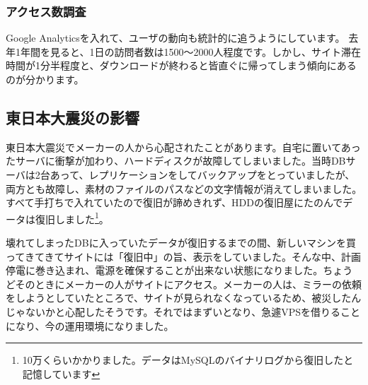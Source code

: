 
\subsubsection{アクセス数調査}
Google Analyticsを入れて、ユーザの動向も統計的に追うようにしています。
去年1年間を見ると、1日の訪問者数は1500～2000人程度です。しかし、サイト滞在時間が1分半程度と、ダウンロードが終わると皆直ぐに帰ってしまう傾向にあるのが分かります。

\subsection{東日本大震災の影響}
%

東日本大震災でメーカーの人から心配されたことがあります。自宅に置いてあったサーバに衝撃が加わり、ハードディスクが故障してしまいました。当時DBサーバは2台あって、レプリケーションをしてバックアップをとっていましたが、両方とも故障し、素材のファイルのパスなどの文字情報が消えてしまいました。すべて手打ちで入れていたので復旧が諦めきれず、HDDの復旧屋にたのんでデータは復旧しました\footnote{10万くらいかかりました。データはMySQLのバイナリログから復旧したと記憶しています}。

壊れてしまったDBに入っていたデータが復旧するまでの間、新しいマシンを買ってきてきてサイトには「復旧中」の旨、表示をしていました。そんな中、計画停電に巻き込まれ、電源を確保することが出来ない状態になりました。ちょうどそのときにメーカーの人がサイトにアクセス。メーカーの人は、ミラーの依頼をしようとしていたところで、サイトが見られなくなっているため、被災したんじゃないかと心配したそうです。それではまずいとなり、急遽VPSを借りることになり、今の運用環境になりました。



